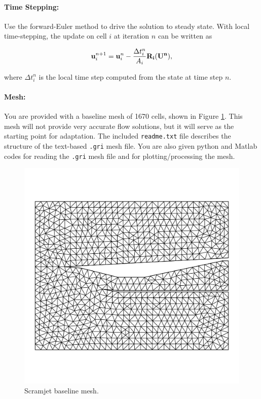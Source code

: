 \paragraph{Time Stepping:} Use the forward-Euler method to drive the solution to steady state. With local
time-stepping, the update on cell $i$ at iteration $n$ can be written as

\begin{equation}\label{eqn:forward_euler}
    {\bf u}_i^{n+1} = {\bf u}_i^n - \frac{\Delta t_i^n}{A_i}{\bf R_i(U^n)},
\end{equation}

where $\Delta t^n_i$ is the local time step computed from the state at time step $n$.

\pagebreak
\paragraph{Mesh:} You are provided with a baseline mesh of 1670 cells, shown in Figure \ref{fig:baseline_mesh}. This mesh will not provide very accurate flow solutions, but it will serve as the starting point for adaptation. The included {\texttt{readme.txt}} file describes the structure of the text-based {\texttt{.gri}} mesh file. You are also given python and Matlab codes for reading the {\texttt{.gri}} mesh file and for plotting/processing the mesh.

\begin{figure}[h]
    \centering
    \includegraphics[width = 0.75\linewidth]{admin/baseline_mesh.pdf}
    \caption[Scramjet Baseline Mesh]{Scramjet baseline mesh.}
    \label{fig:baseline_mesh}
\end{figure}

